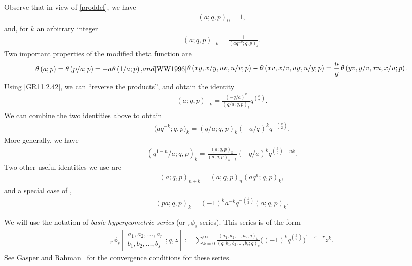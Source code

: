 \documentclass[pdftex]{sigma}
\numberwithin{equation}{section}
\newcommand{\qrfac}[2]{{\left({#1}; q\right)_{#2}}} %
\newcommand{\ellipticqrfac}[2]{{\left({#1}; q, p\right)_{#2}}} %
\newcommand{\elliptictheta}[1]{\theta \left({#1} ; p\right) }
\begin{document}
Observe that in view of \eqref{proddef}, we have
\begin{gather*}\ellipticqrfac{a}{0} = 1,
\end{gather*}
and, for $k$ an arbitrary integer
\begin{gather*}
\ellipticqrfac{a}{-k} =\frac{1}{\ellipticqrfac{aq^{-k}}{k}}.
\end{gather*}
Two important properties of the modified theta function are
\cite[equation~(11.2.42)]{GR90}
\begin{subequations}
\begin{gather}\label{GR11.2.42}
\elliptictheta{a} =\elliptictheta{p/a} =-a\elliptictheta{1/a},
\end{gather}
and \cite[p.~451, Example~5]{WW1996}
\begin{gather}\label{addf}
\elliptictheta{xy,x/y,uv,u/v}-\elliptictheta{xv,x/v,uy,u/y}=\frac uy\,\elliptictheta{yv,y/v,xu,x/u}.
\end{gather}
\end{subequations}
Using \eqref{GR11.2.42}, we can ``reverse the products'', and obtain the identity \cite[equation~(11.2.53)]{GR90}
\begin{gather}\label{GR11.2.53}
\ellipticqrfac{a}{-k} = \frac{\left( -q/a \right)^k}{\ellipticqrfac{q/a}{k}} q^{\binom k2}.
\end{gather}
We can combine the two identities above to obtain
\begin{gather}\label{GR11.2.50}
\big({aq^{-k};q,p}\big)_{k} =\ellipticqrfac{q/a}{k} \left(-{a}/{q}\right)^kq^{-{\binom k2}}.
\end{gather}
More generally, we have \cite[equation~(11.2.49) rewritten]{GR90}
\begin{gather}\label{GR11.2.49r}
\ellipticqrfac{q^{1-n}/a}{k} = \frac{\ellipticqrfac{a}{n}}
{\ellipticqrfac{a}{n-k}} \left( - {q}/{a}\right)^kq^{{\binom k2}-nk}.
\end{gather}
Two other useful identities we use are
\cite[equation~(11.2.47)]{GR90}
\begin{gather}\label{GR11.2.47}
\ellipticqrfac{a}{n+k} =\ellipticqrfac{a}{n}\ellipticqrfac{aq^n}{k},
\end{gather}
and a special case of \cite[equation~(11.2.55)]{GR90},
\begin{gather}\label{GR11.2.55a}
\ellipticqrfac{pa}{k} = (-1)^ka^{-k}q^{-{\binom k2}}\ellipticqrfac{a}{k}.
\end{gather}

We will use the notation of {\em basic hypergeometric series} (or $_r\phi_s$ series). This series is of the form
\begin{gather*}
_{r}\phi_s \left[\begin{matrix}
a_1,a_2,\dots,a_r \\
b_1,b_2,\dots,b_s\end{matrix} ; q, z
\right] :=
\sum_{k=0}^{\infty} \frac{\qrfac{a_1,a_2,\dots, a_r}{k}}{\qrfac{q, b_1,b_2,\dots, b_s}{k}}
\big( (-1)^kq^{\binom k2}\big)^{1+s-r} z^k.
\end{gather*}
See Gasper and Rahman~\cite{GR90} for the convergence conditions for these series.
\end{document}

